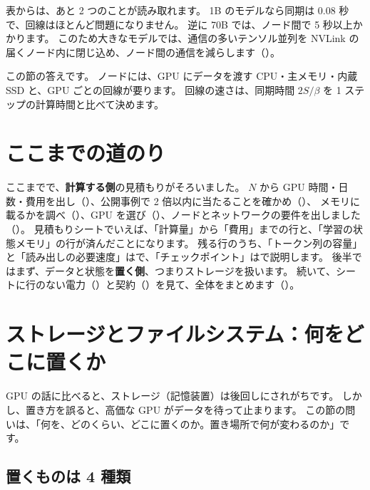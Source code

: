 表からは、あと 2 つのことが読み取れます。
1B のモデルなら同期は 0.08 秒で、回線はほとんど問題になりません。
逆に 70B では、ノード間で 5 秒以上かかります。
このため大きなモデルでは、通信の多いテンソル並列を NVLink の届くノード内に閉じ込め、ノード間の通信を減らします（）。

この節の答えです。
ノードには、GPU にデータを渡す CPU・主メモリ・内蔵 SSD と、GPU ごとの回線が要ります。
回線の速さは、同期時間 $2S/\beta$ を 1 ステップの計算時間と比べて決めます。

\section*{ここまでの道のり}

ここまでで、\textbf{計算する側}の見積もりがそろいました。
$N$ から GPU 時間・日数・費用を出し（）、公開事例で 2 倍以内に当たることを確かめ（）、
メモリに載るかを調べ（）、GPU を選び（）、ノードとネットワークの要件を出しました（）。
見積もりシートでいえば、「計算量」から「費用」までの行と、「学習の状態メモリ」の行が済んだことになります。
残る行のうち、「トークン列の容量」と「読み出しの必要速度」はで、「チェックポイント」はで説明します。
後半ではまず、データと状態を\textbf{置く側}、つまりストレージを扱います。
続いて、シートに行のない電力（）と契約（）を見て、全体をまとめます（）。

\section{ストレージとファイルシステム：何をどこに置くか}\label{sec:infra-storage}

GPU の話に比べると、ストレージ（記憶装置）は後回しにされがちです。
しかし、置き方を誤ると、高価な GPU がデータを待って止まります。
この節の問いは、「何を、どのくらい、どこに置くのか。置き場所で何が変わるのか」です。

\subsection*{置くものは 4 種類}

